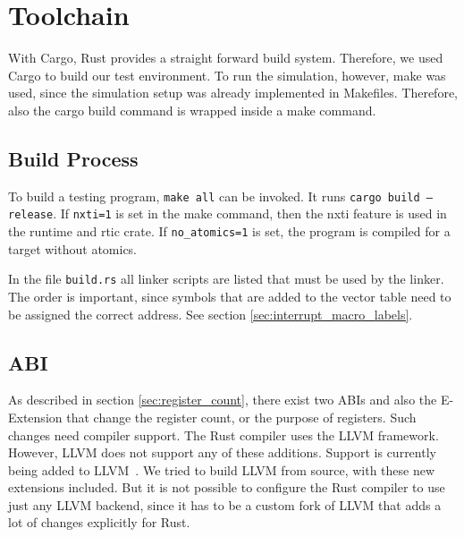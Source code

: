 \section{Toolchain}
With Cargo, Rust provides a straight forward build system. Therefore, we used Cargo to build our test environment. To run the simulation, however, make was used, since the simulation setup was already implemented in Makefiles. Therefore, also the cargo build command is wrapped inside a make command.

\subsection{Build Process}
To build a testing program, \texttt{make all} can be invoked.
It runs \texttt{cargo build --release}.  If \texttt{nxti=1} is set in the make command, then the nxti feature is used in the runtime and \gls{rtic} crate. If \texttt{no_atomics=1} is set, the program is compiled for a target without atomics.

In the file \texttt{build.rs} all linker scripts are listed that must be used by the linker. The order is important, since symbols that are added to the vector table need to be assigned the correct address. See section \ref{sec:interrupt_macro_labels}.

\subsection{ABI}
As described in section \ref{sec:register_count}, there exist two ABIs and also the E-Extension that change the register count, or the purpose of registers. Such changes need compiler support.
The Rust compiler uses the LLVM framework. However, LLVM does not support any of these additions. Support is currently being added to LLVM~\cite{llvmRISCVEExtension}. We tried to build LLVM from source, with these new extensions included. But it is not possible to configure the Rust compiler to use just any LLVM backend, since it has to be a custom fork of LLVM that adds a lot of changes explicitly for Rust.